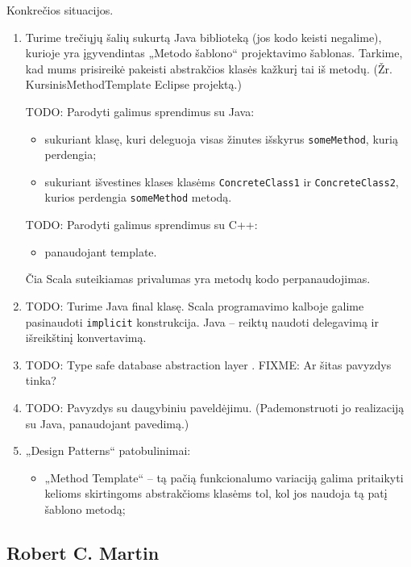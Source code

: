 Konkrečios situacijos.
\begin{enumerate}
  \item Turime trečiųjų šalių sukurtą Java biblioteką (jos kodo
    keisti negalime), kurioje yra įgyvendintas „Metodo šablono“
    projektavimo šablonas. Tarkime, kad mums prisireikė pakeisti
    abstrakčios klasės kažkurį tai iš metodų. (Žr. KursinisMethodTemplate
    Eclipse projektą.)

    TODO: Parodyti galimus sprendimus su Java:
    \begin{itemize}
      \item sukuriant klasę, kuri deleguoja visas žinutes išskyrus
        \verb|someMethod|, kurią perdengia;
      \item sukuriant išvestines klases klasėms \verb|ConcreteClass1|
        ir \verb|ConcreteClass2|, kurios perdengia \verb|someMethod|
        metodą.
    \end{itemize}

    TODO: Parodyti galimus sprendimus su C++:
    \begin{itemize}
      \item panaudojant template.
    \end{itemize}

    Čia Scala suteikiamas privalumas yra metodų kodo perpanaudojimas.

  \item TODO: Turime Java final klasę. Scala programavimo kalboje
    galime pasinaudoti \verb|implicit| konstrukcija. Java – reiktų
    naudoti delegavimą ir išreikštinį konvertavimą.
  \item TODO: Type safe database abstraction layer
    \cite[190]{beginning-scala}.
    FIXME: Ar šitas pavyzdys tinka?
  \item TODO: Pavyzdys su daugybiniu paveldėjimu. (Pademonstruoti jo
    realizaciją su Java, panaudojant pavedimą.)
  \item „Design Patterns“ patobulinimai:
    \begin{itemize}
      \item „Method Template“ – tą pačią funkcionalumo variaciją galima
        pritaikyti kelioms skirtingoms abstrakčioms klasėms tol, kol
        jos naudoja tą patį šablono metodą;
    \end{itemize}
\end{enumerate}

\subsection{Robert C. Martin}

